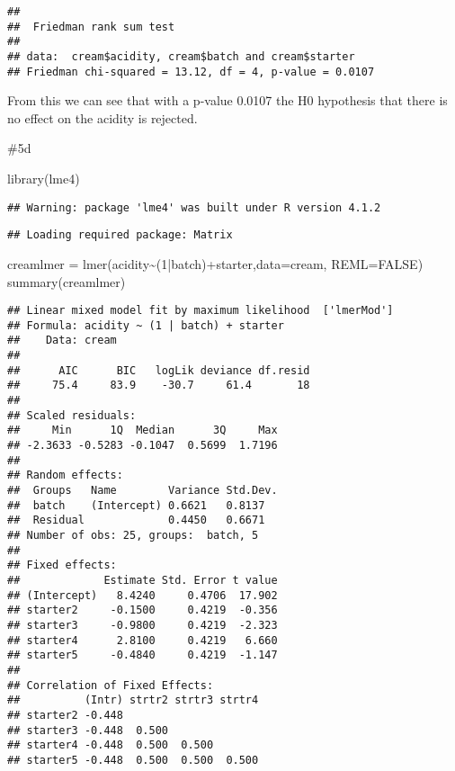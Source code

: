\documentclass[
]{article}
\newenvironment{Shaded}{\begin{snugshade}}{\end{snugshade}}
\newcommand{\AttributeTok}[1]{\textcolor[rgb]{0.77,0.63,0.00}{#1}}
\newcommand{\ConstantTok}[1]{\textcolor[rgb]{0.00,0.00,0.00}{#1}}
\newcommand{\DecValTok}[1]{\textcolor[rgb]{0.00,0.00,0.81}{#1}}
\newcommand{\FunctionTok}[1]{\textcolor[rgb]{0.00,0.00,0.00}{#1}}
\newcommand{\NormalTok}[1]{#1}
\newcommand{\OtherTok}[1]{\textcolor[rgb]{0.56,0.35,0.01}{#1}}
\newcommand{\SpecialCharTok}[1]{\textcolor[rgb]{0.00,0.00,0.00}{#1}}
\begin{document}
\begin{verbatim}
## 
##  Friedman rank sum test
## 
## data:  cream$acidity, cream$batch and cream$starter
## Friedman chi-squared = 13.12, df = 4, p-value = 0.0107
\end{verbatim}

From this we can see that with a p-value 0.0107 the H0 hypothesis that
there is no effect on the acidity is rejected.

\#5d

\begin{Shaded}
\begin{Highlighting}[]
\FunctionTok{library}\NormalTok{(lme4)}
\end{Highlighting}
\end{Shaded}

\begin{verbatim}
## Warning: package 'lme4' was built under R version 4.1.2
\end{verbatim}

\begin{verbatim}
## Loading required package: Matrix
\end{verbatim}

\begin{Shaded}
\begin{Highlighting}[]
\NormalTok{creamlmer }\OtherTok{=} \FunctionTok{lmer}\NormalTok{(acidity}\SpecialCharTok{\textasciitilde{}}\NormalTok{(}\DecValTok{1}\SpecialCharTok{|}\NormalTok{batch)}\SpecialCharTok{+}\NormalTok{starter,}\AttributeTok{data=}\NormalTok{cream, }\AttributeTok{REML=}\ConstantTok{FALSE}\NormalTok{)}
\FunctionTok{summary}\NormalTok{(creamlmer)}
\end{Highlighting}
\end{Shaded}

\begin{verbatim}
## Linear mixed model fit by maximum likelihood  ['lmerMod']
## Formula: acidity ~ (1 | batch) + starter
##    Data: cream
## 
##      AIC      BIC   logLik deviance df.resid 
##     75.4     83.9    -30.7     61.4       18 
## 
## Scaled residuals: 
##     Min      1Q  Median      3Q     Max 
## -2.3633 -0.5283 -0.1047  0.5699  1.7196 
## 
## Random effects:
##  Groups   Name        Variance Std.Dev.
##  batch    (Intercept) 0.6621   0.8137  
##  Residual             0.4450   0.6671  
## Number of obs: 25, groups:  batch, 5
## 
## Fixed effects:
##             Estimate Std. Error t value
## (Intercept)   8.4240     0.4706  17.902
## starter2     -0.1500     0.4219  -0.356
## starter3     -0.9800     0.4219  -2.323
## starter4      2.8100     0.4219   6.660
## starter5     -0.4840     0.4219  -1.147
## 
## Correlation of Fixed Effects:
##          (Intr) strtr2 strtr3 strtr4
## starter2 -0.448                     
## starter3 -0.448  0.500              
## starter4 -0.448  0.500  0.500       
## starter5 -0.448  0.500  0.500  0.500
\end{verbatim}
\end{document}
